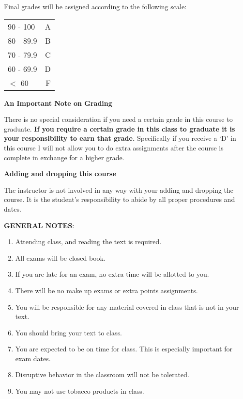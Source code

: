 \documentclass{article}
\begin{document}
\vspace*{5pt}
\begin{center}
{Final grades will be assigned according to the following scale}:
\end{center}
\begin{center}
\begin{tabular}{lr}
90 - 100 &  A \\
80 - 89.9 &  B \\
70 - 79.9 &  C \\
60 - 69.9 &  D \\
$<$ 60 &  F \\
\end{tabular}
\end{center}
\vspace*{5pt}
\begin{center}
{\bf An Important Note on Grading}
\end{center}
There is no special consideration if you need a certain grade in this course to graduate.  {\bf If you require a certain grade in this class to graduate it is your responsibility to earn that grade.} Specifically if you receive a `D' in this course I will not allow you to do extra assignments after the course is complete in exchange for a higher grade. 
\begin{center}
{\bf Adding and dropping this course}
\end{center}
The instructor is not involved in any way with your adding and dropping the course.  It is the student's responsibility to abide by all proper procedures and dates.  \\
\begin{center}
{\bf GENERAL NOTES}:
\end{center}
\begin{enumerate}
\item Attending class, and reading the text is required.
\item All exams will be closed book.
\item If you are late for an exam, no extra time will be allotted to you.
\item There will be no make up exams or extra points assignments.
\item You will be responsible for any material covered in class that is not in your text.
\item You should bring your text to class.
\item You are expected to be on time for class. This is especially important for exam
dates.
\item Disruptive behavior in the classroom will not be tolerated.
\item You may not use tobacco products in class.
\end{enumerate}
\end{document}
